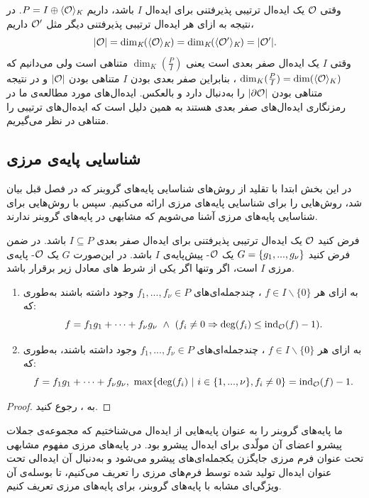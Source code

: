 \begin{remark}
وقتی 
${\mathcal O}$
یک ایده‌ال ترتیبی پذیرفتنی برای ایده‌ال 
$I$
باشد، داریم
$P = I\oplus \langle{\mathcal O}\rangle_{\textit{K}}$.
در نتیجه به ازای هر ایده‌ال ترتیبی پذیرفتنی دیگر مثل 
${\mathcal O}'$
داریم، 
$$|{\mathcal O}| = \dim_{\textit{K}}(\langle{\mathcal O}\rangle_{\textit{K}})= \dim_{\textit{K}}(\langle{\mathcal O}'\rangle_{\textit{K}}) = |{\mathcal O}'|.$$
وقتی 
$I$
یک ایده‌ال صفر بعدی است یعنی 
$\dim_{K}(\frac{P}{I})$
متناهی است ولی می‌دانیم که 
$\dim_{K}(\frac{P}{I}) = \dim(\langle{\mathcal O}\rangle_{K})$
، بنابراین صفر بعدی بودن 
$I$
متناهی بودن 
$|{\mathcal O}|$
و در نتیجه متناهی بودن 
$|\partial\mathcal{O}|$
را به‌دنبال دارد و بالعکس.  ایده‌ال‌های مورد مطالعه‌ی ما در رمزنگاری ایده‌ال‌های صفر بعدی هستند به همین دلیل است که ایده‌ال‌های ترتیبی  را متناهی در نظر می‌گیریم. 
\end{remark}

\subsection*{شناسایی پایه‌ی مرزی}
در این بخش ابتدا با تقلید از روش‌های شناسایی پایه‌های گروبنر که در فصل قبل بیان شد، روش‌هایی را برای شناسایی پایه‌های مرزی ارائه می‌کنیم. سپس  با روش‌هایی برای شناسایی پایه‌های مرزی آشنا می‌شویم که مشابهی در پایه‌های گروبنر ندارند.

\begin{proposition}
فرض کنید 
${\mathcal O}$
یک ایده‌ال ترتیبی پذیرفتنی برای ایده‌ال صفر بعدی 
$I\subseteq P$
باشد. در ضمن فرض کنید 
$G = \{g_{1},...,g_{\nu}\}$
یک 
${\mathcal O}$-
پیش‌پایه‌ی 
$I$
باشد. در این‌صورت 
$G$
یک 
${\mathcal O}$-
پایه‌ی مرزی 
$I$
است، اگر وتنها اگر یکی از شرط های معادل زیر برقرار باشد.
\begin{enumerate}
\item
به ازای هر 
$f\in I\backslash\{0\}$
، چندجمله‌ای‌های 
$f_{1},...,f_{\nu}\in P$
وجود داشته باشند به‌طوری که:
$$f = f_{1}g_{1} + \cdots + f_{\nu}g_{\nu} \  \wedge \  (f_{i}\neq 0\Rightarrow \deg(f_{i})\leq \operatorname{\mathrm{ind}}_{{\mathcal O}}(f) - 1).$$
\item
به ازای هر 
$f\in I\backslash\{0\}$
، چندجمله‌ای‌های 
$f_{1},...,f_{\nu}\in P$
وجود داشته باشند، به‌طوری که:
$$f = f_{1}g_{1} +\cdots + f_{\nu}g_{\nu}, \ \max\{\deg(f_{i}) \ | \ i\in\{1,...,\nu\}, f_{i} \neq 0\} = \operatorname{\mathrm{ind}}_{{\mathcal O}}(f) - 1.$$
\end{enumerate}
\end{proposition}
\begin{proof}
به 
{\small \cite[ص.۴۳۱]{cca2_kreuzer}}
، رجوع کنید.
\end{proof}

ما پایه‌های گروبنر را به عنوان پایه‌هایی از ایده‌ال می‌شناختیم که مجموعه‌ی جملات پیشرو اعضای آن مولّدی برای ایده‌ال پیشرو بود. در پایه‌های مرزی مفهوم مشابهی تحت عنوان فرم مرزی جایگزن یکجمله‌ای‌های پیشرو می‌شود و به‌دنبال آن ایده‌الی تحت عنوان ایده‌ال تولید شده توسط فرم‌های مرزی را تعریف می‌کنیم، تا بوسله‌ی آن ویژگی‌ای مشابه با پایه‌های گروبنر، برای پایه‌های مرزی تعریف کنیم.


